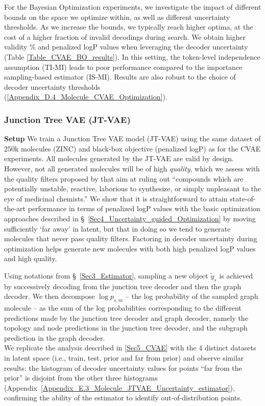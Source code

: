 For the Bayesian Optimization experiments, we investigate the impact of different bounds on the space we optimize within, as well as different uncertainty thresholds. As we increase the bounds, we typically reach higher optima, at the cost of a higher fraction of invalid decodings during search. We obtain higher validity \% and penalized logP values when leveraging the decoder uncertainty (Table \ref{Table_CVAE_BO_results}). In this setting, the token-level independence assumption (TI-MI) leads to poor performance compared to the importance sampling-based estimator (IS-MI). Results are also robust to the choice of decoder uncertainty thresholds (\ref{Appendix_D.4_Molecule_CVAE_Optimization}).



\subsubsection{Junction Tree VAE (JT-VAE)}
\label{Sec5_JTVAE}

\textbf{Setup} We train a Junction Tree VAE model (JT-VAE) \citep{jin2019junction} using the same dataset of 250k molecules (ZINC) and black-box objective (penalized logP) as for the CVAE experiments. 
All molecules generated by the JT-VAE are valid by design. However, not all generated molecules will be of high \emph{quality}, which we assess with the quality filters proposed by \citet{Brown_2019} that aim at ruling out ``compounds which are potentially unstable, reactive, laborious to synthesize, or simply unpleasant to the eye of medicinal chemists.''
We show that it is straightforward to attain state-of-the-art performance in terms of penalized logP values with the basic optimization approaches described in \S~\ref{Sec4_Uncertainty_guided_Optimization} by moving sufficiently `far away' in latent, but that in doing so we tend to generate molecules that never pass quality filters. Factoring in decoder uncertainty during optimization helps generate new molecules with both high penalized logP values and high quality.

Using notations from \S~\ref{Sec3_Estimator}, sampling a new object $\tilde{y}_s$ is achieved by successively decoding from the junction tree decoder and then the graph decoder. We then decompose $\log{p_{s,m}}$ -- the log probability of the sampled graph molecule -- as the sum of the log probabilities corresponding to the different predictions made by the junction tree decoder and graph decoder, namely the topology and node predictions in the junction tree decoder, and the subgraph prediction in the graph decoder. \\
We replicate the analysis described in \ref{Sec5_CVAE} with the 4 distinct datasets in latent space (i.e., train, test, prior and far from prior) and observe similar results: the histogram of decoder uncertainty values for points ``far from the prior'' is disjoint from the other three histograms (Appendix~\ref{Appendix_E.3_Molecule_JTVAE_Uncertainty_estimator}), confirming the ability of the estimator to identify out-of-distribution points.

